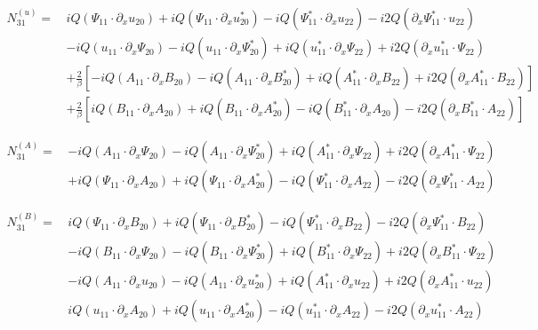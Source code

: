 \documentclass{emulateapj}
\newcommand{\beq}{\begin{equation}}
\newcommand{\eeq}{\end{equation}}
\begin{document}
\begin{appendices}
\begin{widetext}
\beq
\begin{split}
N_{31}^{(u)} = \, & i Q \left(\Psi_{11} \cdot \partial_x u_{20}\right) + i Q \left(\Psi_{11} \cdot \partial_x u_{20}^*\right) - i Q \left(\Psi_{11}^* \cdot \partial_x u_{22}\right) - i 2 Q \left(\partial_x \Psi_{11}^* \cdot u_{22}\right) \\
& - i Q \left(u_{11} \cdot \partial_x \Psi_{20} \right) - i Q \left(u_{11} \cdot \partial_x \Psi_{20}^*\right) + i Q \left(u_{11}^* \cdot \partial_x \Psi_{22} \right) + i 2 Q \left(\partial_x u_{11}^* \cdot \Psi_{22}\right) \\
& +\frac{2}{\beta}\left[- i Q \left(A_{11} \cdot \partial_x B_{20}\right) - i Q \left(A_{11} \cdot \partial_x B_{20}^*\right) + i Q \left(A_{11}^* \cdot \partial_x B_{22}\right) + i 2 Q \left(\partial_x A_{11}^* \cdot B_{22}\right)\right] \\
& +\frac{2}{\beta}\left[ i Q \left(B_{11} \cdot \partial_x A_{20}\right) + i Q \left(B_{11} \cdot \partial_x A_{20}^*\right) - i Q \left(B_{11}^* \cdot \partial_x A_{20}\right) - i 2 Q \left(\partial_x B_{11}^* \cdot A_{22}\right)\right]
\end{split}
\eeq

\beq
\begin{split}
N_{31}^{(A)} =\, & -i Q \left(A_{11}\cdot\partial_x \Psi_{20}\right) - i Q \left(A_{11} \cdot \partial_x \Psi_{20}^*\right)
 + i Q \left(A_{11}^* \cdot \partial_x \Psi_{22}\right) + i 2 Q \left(\partial_x A_{11}^* \cdot \Psi_{22}\right) \\
 & + i Q \left(\Psi_{11} \cdot \partial_x A_{20}\right) + i Q \left(\Psi_{11} \cdot \partial_x A_{20}^*\right) - i Q \left(\Psi_{11}^* \cdot \partial_x A_{22} \right) - i 2 Q \left(\partial_x \Psi_{11}^* \cdot A_{22}\right)
\end{split}
\eeq

\beq
\begin{split}
N_{31}^{(B)} = \, & i Q \left(\Psi_{11} \cdot \partial_x B_{20}\right) + i Q \left(\Psi_{11} \cdot \partial_x B_{20}^*\right) - i Q \left(\Psi_{11}^* \cdot \partial_x B_{22}\right) - i 2 Q\left(\partial_x \Psi_{11}^* \cdot B_{22}\right) \\
& - i Q \left(B_{11} \cdot \partial_x \Psi_{20}\right) - i Q \left(B_{11} \cdot \partial_x \Psi_{20}^*\right) + i Q\left(B_{11}^* \cdot \partial_x \Psi_{22}\right) + i 2 Q \left(\partial_x B_{11}^* \cdot \Psi_{22}\right) \\
& - i Q \left(A_{11} \cdot \partial_x u_{20}\right) - i Q \left(A_{11} \cdot \partial_x u_{20}^*\right) + i Q \left(A_{11}^* \cdot \partial_x u_{22}\right) + i 2 Q \left(\partial_x A_{11}^* \cdot u_{22}\right) \\
& i Q \left(u_{11} \cdot \partial_x A_{20} \right) + i Q \left(u_{11} \cdot \partial_x A_{20}^*\right) - i Q \left(u_{11}^* \cdot \partial_x A_{22}\right) - i 2 Q \left(\partial_x u_{11}^* \cdot A_{22}\right)
\end{split}
\eeq

\end{widetext}
\end{appendices}
\end{document}
